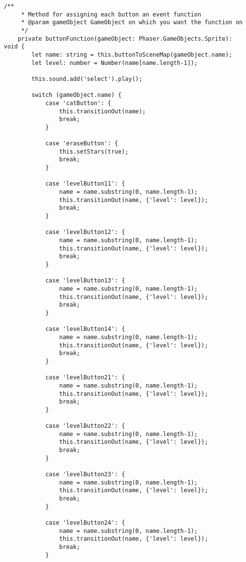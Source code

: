 \begin{lstlisting}[style=TypeScript, caption={levelMenuScene.ts}]
    /**
     * Method for assigning each button an event function
     * @param gameObject GameObject on which you want the function on
     */
    private buttonFunction(gameObject: Phaser.GameObjects.Sprite): void {
        let name: string = this.buttonToSceneMap(gameObject.name);
        let level: number = Number(name[name.length-1]);

        this.sound.add('select').play();

        switch (gameObject.name) {
            case 'catButton': {
                this.transitionOut(name);
                break;
            }

            case 'eraseButton': {
                this.setStars(true);
                break;
            }

            case 'levelButton11': {
                name = name.substring(0, name.length-1);
                this.transitionOut(name, {'level': level});
                break;
            }

            case 'levelButton12': {
                name = name.substring(0, name.length-1);
                this.transitionOut(name, {'level': level});
                break;
            }

            case 'levelButton13': {
                name = name.substring(0, name.length-1);
                this.transitionOut(name, {'level': level});
                break;
            }

            case 'levelButton14': {
                name = name.substring(0, name.length-1);
                this.transitionOut(name, {'level': level});
                break;
            }

            case 'levelButton21': {
                name = name.substring(0, name.length-1);
                this.transitionOut(name, {'level': level});
                break;
            }

            case 'levelButton22': {
                name = name.substring(0, name.length-1);
                this.transitionOut(name, {'level': level});
                break;
            }

            case 'levelButton23': {
                name = name.substring(0, name.length-1);
                this.transitionOut(name, {'level': level});
                break;
            }

            case 'levelButton24': {
                name = name.substring(0, name.length-1);
                this.transitionOut(name, {'level': level});
                break;
            }


\end{lstlisting}
